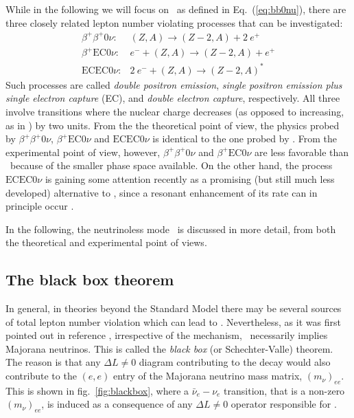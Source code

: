 While in the following we will focus on \bbonu\ as defined in Eq.~(\ref{eq:bb0nu}), there are three closely related lepton number violating processes that can be investigated:
%
\begin{eqnarray}
\beta^+\beta^+0\nu: & (Z,A) \to (Z-2,A) + 2\ e^+  \label{eq:b+b+}\\
\beta^+\text{EC}0\nu: & e^- + (Z,A) \to (Z-2,A) + e^+ \label{eq:b+EC}\\
\text{ECEC}0\nu: & 2\ e^- + (Z,A) \to (Z-2,A)^\ast \label{eq:ECEC}
\end{eqnarray}
%
Such processes are called \emph{double positron emission}, \emph{single positron emission plus single electron capture} (EC), and \emph{double electron capture}, respectively. All three involve transitions where the nuclear charge decreases (as opposed to increasing, as in \bbonu) by two units. From the the theoretical point of view, the physics probed by $\beta^+\beta^+0\nu$, $\beta^+\text{EC}0\nu$ and $\text{ECEC}0\nu$ is identical to the one probed by \bbonu. From the experimental point of view, however, $\beta^+\beta^+0\nu$ and $\beta^+\text{EC}0\nu$ are less favorable than \bbonu\ because of the smaller phase space available. On the other hand, the process $\text{ECEC}0\nu$ is gaining some attention recently as a promising (but still much less developed) alternative to \bbonu, since a resonant enhancement of its rate can in principle occur \cite{Eliseev:2011zza}.

In the following, the neutrinoless mode \bbonu\ is discussed in more detail, from both the theoretical and experimental point of views.

\subsection{The black box theorem } \label{subsec:bb0nu_blackbox}
In general, in theories beyond the Standard Model there may be several sources of total lepton number violation which can lead to \bbonu. Nevertheless, as it was first pointed out in reference \cite{Schechter:1981bd}, irrespective of the mechanism, \bbonu\ necessarily implies Majorana neutrinos. This is called the \emph{black box} (or Schechter-Valle) theorem. The reason is that any $\Delta L\neq 0$ diagram contributing to the decay would also contribute to the $(e,e)$ entry of the Majorana neutrino mass matrix, $(m_{\nu})_{ee}$. This is shown in fig.~\ref{fig:blackbox}, where a $\bar{\nu}_e-\nu_e$ transition, that is a non-zero $(m_{\nu})_{ee}$, is induced as a consequence of any $\Delta L\neq 0$ operator responsible for \bbonu.

